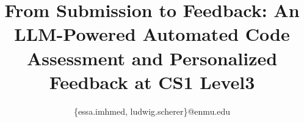 \documentclass[conference]{IEEEtran}
\begin{document}
\title{From Submission to Feedback: An
LLM-Powered Automated Code Assessment
and Personalized Feedback at CS1 Level3}

\author{
\{essa.imhmed, ludwig.scherer\}@enmu.edu \\
}

\end{document}
